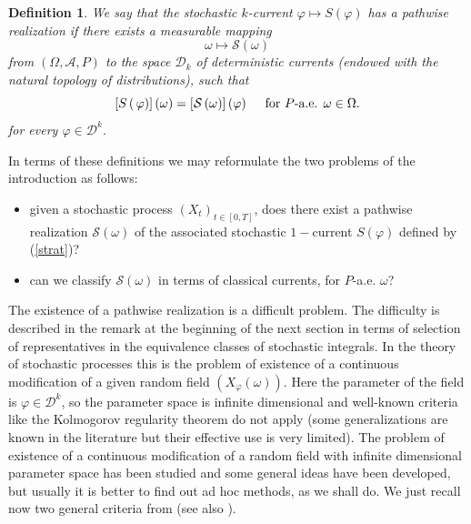\documentclass{article}
\newtheorem{definition}[theorem]{Definition}
\begin{document}
\begin{definition}
We say that the stochastic $k$-current $\varphi \mapsto S\left( \varphi
\right) $ has a \textit{pathwise realization} if there exists a measurable
mapping 
\begin{equation*}
\omega \mapsto \mathcal{S}\left( \omega \right)
\end{equation*}
from $\left( \Omega ,\mathcal{A},P\right) $ to the space $\mathcal{D}_{k}$
of deterministic currents (endowed with the natural topology of
distributions), such that 
\begin{equation}
\left[ S\left( \,\varphi \right) \right] \left( \omega \right) =\left[ 
\mathcal{S}\left( \omega \right) \right] \left( \varphi \right) \text{ \quad
for }P\text{-a.e. }\omega \in \Omega .  \label{modific}
\end{equation}
for every $\varphi \in \mathcal{D}^{k}$.
\end{definition}
In terms of these definitions we may reformulate the two problems of the
introduction as follows:
\begin{itemize}
\item[a)] given a stochastic process $\left( X_{t}\right) _{t\in \left[ 0,T\right]
} $, does there exist a pathwise realization $\mathcal{S}\left( \omega
\right) $ of the associated stochastic $1-$current $S\left( \varphi \right) $
defined by (\ref{strat})?
\item[b)] can we classify $\mathcal{S}\left( \omega \right) $ in terms of classical
currents, for $P$-a.e. $\omega $?
\end{itemize}
The existence of a pathwise realization is a difficult problem. The
difficulty is described in the remark at the beginning of the next section
in terms of selection of representatives in the equivalence classes of
stochastic integrals. In the theory of stochastic processes this is the
problem of existence of a continuous modification of a given random field $%
\left( X_{\varphi }\left( \omega \right) \right) $. Here the parameter of
the field is $\varphi \in \mathcal{D}^{k}$, so the parameter space is
infinite dimensional and well-known criteria like the Kolmogorov regularity
theorem do not apply (some generalizations are known in the literature but
their effective use is very limited). The problem of existence of a
continuous modification of a random field with infinite dimensional
parameter space has been studied and some general ideas have been developed,
but usually it is better to find out ad hoc methods, as we shall do. We just
recall now two general criteria from \cite{Sk} (see also \cite{Fbook}).
\end{document}
